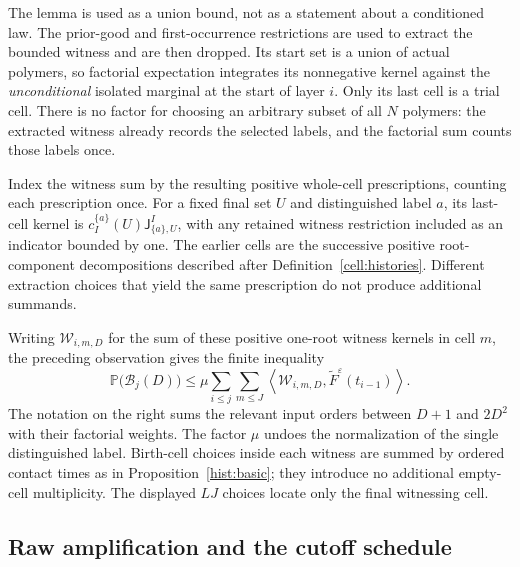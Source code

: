 The lemma is used as a union bound, not as a statement about a
conditioned law. The prior-good and first-occurrence restrictions
are used to extract the bounded witness and are then dropped.
Its start set is a union of actual polymers, so factorial
expectation integrates its nonnegative kernel against the
\emph{unconditional} isolated marginal at the start of layer
$i$. Only its last cell is a trial cell. There is no factor for
choosing an arbitrary subset of all $N$ polymers: the extracted
witness already records the selected labels, and the factorial
sum counts those labels once.

Index the witness sum by the resulting positive whole-cell
prescriptions, counting each prescription once. For a fixed
final set $U$ and distinguished label $a$, its last-cell kernel
is $c_I^{\{a\}}(U)\mathsf J^I_{\{a\},U}$, with any retained
witness restriction included as an indicator bounded by one.
The earlier cells are the successive positive root-component
decompositions described after Definition~\ref{cell:histories}.
Different extraction choices that yield the same prescription
do not produce additional summands.

Writing $\mathcal W_{i,m,D}$ for the sum of these positive
one-root witness kernels in cell $m$, the preceding observation
gives the finite inequality
\begin{equation}\label{close:witness-union}
 \mathbb P\bigl(\mathcal B_j(D)\bigr)
 \leq \mu\sum_{i\leq j}\sum_{m\leq J}
 \left\langle\mathcal W_{i,m,D},
       \widetilde F^\varepsilon(t_{i-1})\right\rangle .
\end{equation}
The notation on the right sums the relevant input orders between
$D+1$ and $2D^2$ with their factorial weights. The factor $\mu$
undoes the normalization of the single distinguished label.
Birth-cell choices inside each witness are summed by ordered
contact times as in Proposition~\ref{hist:basic}; they introduce
no additional empty-cell multiplicity. The displayed $LJ$
choices locate only the final witnessing cell.

\subsection{Raw amplification and the cutoff schedule}

